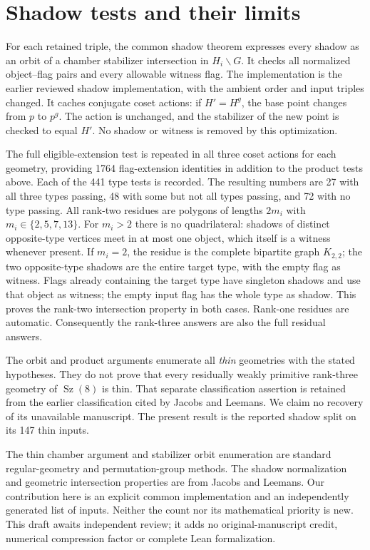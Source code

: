 \documentclass[11pt,a4paper]{article}
\begin{document}
\section*{Shadow tests and their limits}
For each retained triple, the common shadow theorem expresses every
shadow as an orbit of a chamber stabilizer intersection in $H_i\backslash G$.
It checks all normalized object--flag pairs and every allowable witness
flag. The implementation is the earlier reviewed shadow implementation,
with the ambient order and input triples changed. It caches conjugate
coset actions: if $H'=H^g$, the base point changes from $p$ to $p^g$.
The action is unchanged, and the stabilizer of the new point is checked
to equal $H'$. No shadow or witness is removed by this optimization.

The full eligible-extension test is repeated in all three coset actions
for each geometry, providing 1764 flag-extension identities in addition
to the product tests above. Each of the 441 type tests is recorded.
The resulting numbers are 27 with all three types passing, 48 with some
but not all types passing, and 72 with no type passing. All rank-two
residues are polygons of lengths $2m_i$ with $m_i\in\{2,5,7,13\}$.
For $m_i>2$ there is no quadrilateral: shadows of distinct opposite-type
vertices meet in at most one object, which itself is a witness whenever
present. If $m_i=2$, the residue is the complete bipartite graph $K_{2,2}$;
the two opposite-type shadows are the entire target type, with the empty
flag as witness. Flags already containing the target type have singleton
shadows and use that object as witness; the empty input flag has the
whole type as shadow. This proves the rank-two intersection property in
both cases. Rank-one residues are automatic.
Consequently the rank-three answers are also the full residual answers.

The orbit and product arguments enumerate all \emph{thin} geometries
with the stated hypotheses. They do not prove that every residually
weakly primitive rank-three geometry of $\operatorname{Sz}(8)$ is thin.
That separate classification assertion is retained from the earlier
classification cited by Jacobs and Leemans. We claim no recovery of its
unavailable manuscript. The present result is the reported shadow split
on its 147 thin inputs.

The thin chamber argument and stabilizer orbit enumeration are standard
regular-geometry and permutation-group methods. The shadow normalization
and geometric intersection properties are from Jacobs and Leemans.
Our contribution here is an explicit common implementation and an
independently generated list of inputs. Neither the count nor its
mathematical priority is new. This draft awaits independent review; it
adds no original-manuscript credit, numerical compression factor or
complete Lean formalization.
\end{document}
